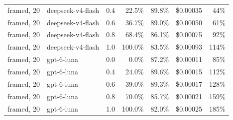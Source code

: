 \begin{tabular}{@{}lllrrrr@{}}
framed, 20 & deepseek-v4-flash & 0.4 & 22.5\% & 89.8\% & \$0.00035 & 44\% \\
framed, 20 & deepseek-v4-flash & 0.6 & 36.7\% & 89.0\% & \$0.00050 & 61\% \\
framed, 20 & deepseek-v4-flash & 0.8 & 68.4\% & 86.1\% & \$0.00075 & 92\% \\
framed, 20 & deepseek-v4-flash & 1.0 & 100.0\% & 83.5\% & \$0.00093 & 114\% \\
framed, 20 & gpt-6-luna & 0.0 & 0.0\% & 87.2\% & \$0.00011 & 85\% \\
framed, 20 & gpt-6-luna & 0.4 & 24.0\% & 89.6\% & \$0.00015 & 112\% \\
framed, 20 & gpt-6-luna & 0.6 & 39.0\% & 89.3\% & \$0.00017 & 128\% \\
framed, 20 & gpt-6-luna & 0.8 & 70.0\% & 85.7\% & \$0.00021 & 159\% \\
framed, 20 & gpt-6-luna & 1.0 & 100.0\% & 82.0\% & \$0.00025 & 185\% \\
\bottomrule
\end{tabular}
